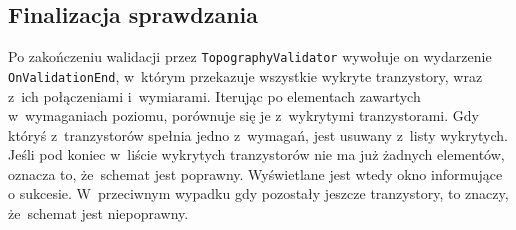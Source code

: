 \subsection{Finalizacja sprawdzania}
\label{subsec:finalizacja_sprawdzania}

Po zakończeniu walidacji przez \texttt{TopographyValidator} wywołuje on wydarzenie \texttt{OnValidationEnd},
w~którym przekazuje wszystkie wykryte tranzystory, wraz z~ich połączeniami i~wymiarami.
Iterując po elementach zawartych w~wymaganiach poziomu,
porównuje się je z~wykrytymi tranzystorami.
Gdy któryś z~tranzystorów spełnia jedno z~wymagań, jest usuwany z~listy wykrytych.
Jeśli pod koniec w~liście wykrytych tranzystorów nie ma już żadnych elementów,
oznacza to, że~schemat jest poprawny.
Wyświetlane jest wtedy okno informujące o sukcesie.
W~przeciwnym wypadku gdy pozostały jeszcze tranzystory, to znaczy, że~schemat jest niepoprawny.